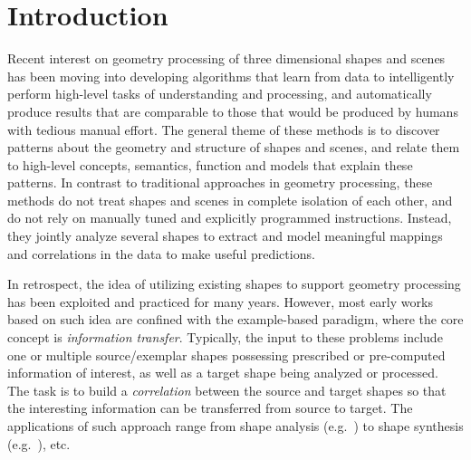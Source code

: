 \section{Introduction}
\label{sec:intro}


Recent interest on geometry processing of three dimensional shapes and scenes has been moving into developing algorithms that learn from data to intelligently
perform high-level tasks of understanding and processing, and automatically produce results that are comparable to those that would be produced by humans with tedious manual effort.
The general theme of these methods is to discover patterns about the geometry and structure of shapes and scenes, and relate them
to high-level concepts, semantics, function and models that explain these patterns. In contrast to traditional approaches in geometry processing, these methods do not treat shapes and scenes
in complete isolation of each other, and do not rely on manually tuned and explicitly programmed instructions.
Instead, they jointly analyze several shapes to extract and model meaningful mappings and correlations in the data to make useful predictions.

In retrospect, the idea of utilizing existing shapes to support geometry processing has been exploited and practiced for many years.
However, most early works based on such idea are confined with the example-based paradigm, where the core concept is \emph{information transfer}.
Typically, the input to these problems include one or multiple source/exemplar shapes possessing prescribed or pre-computed information of interest,
as well as a target shape being analyzed or processed. The task is to build a \emph{correlation} between the source and target shapes so that
the interesting information can be transferred from source to target. The applications of such approach range from
shape analysis (e.g.~\cite{Schaefer:2007:EBS}) to shape synthesis (e.g.~\cite{Ma:2014:ADS}), etc.

